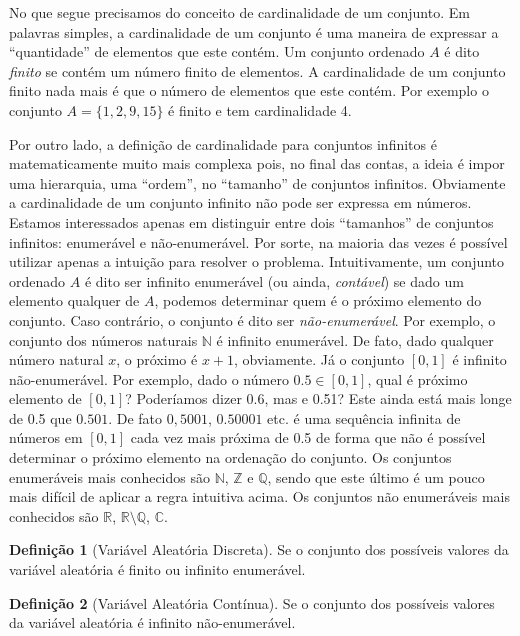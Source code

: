 \documentclass[
]{book}
\theoremstyle{definition}
\newtheorem{definition}{Definição}[chapter]
\theoremstyle{definition}
\theoremstyle{definition}
\theoremstyle{remark}
\begin{document}
No que segue precisamos do conceito de cardinalidade de um conjunto. Em palavras simples, a cardinalidade de um conjunto é uma maneira de expressar a ``quantidade'' de elementos que este contém. Um conjunto ordenado \(A\) é dito \emph{finito} se contém um número finito de elementos. A cardinalidade de um conjunto finito nada mais é que o número de elementos que este contém. Por exemplo o conjunto \(A=\{1,2,9,15\}\) é finito e tem cardinalidade 4.

Por outro lado, a definição de cardinalidade para conjuntos infinitos é matematicamente muito mais complexa pois, no final das contas, a ideia é impor uma hierarquia, uma ``ordem'', no ``tamanho'' de conjuntos infinitos. Obviamente a cardinalidade de um conjunto infinito não pode ser expressa em números. Estamos interessados apenas em distinguir entre dois ``tamanhos'' de conjuntos infinitos: enumerável e não-enumerável. Por sorte, na maioria das vezes é possível utilizar apenas a intuição para resolver o problema. Intuitivamente, um conjunto ordenado \(A\) é dito ser infinito
enumerável (ou ainda, \emph{contável}) se dado um elemento qualquer de \(A\), podemos determinar quem é o próximo elemento do conjunto. Caso contrário, o conjunto é dito ser \emph{não-enumerável}. Por exemplo, o conjunto dos números naturais \(\mathbb{N}\) é infinito enumerável. De fato, dado qualquer número natural \(x\), o próximo é \(x+1\), obviamente. Já o conjunto \([0,1]\) é infinito não-enumerável. Por exemplo, dado o número \(0.5\in[0,1]\), qual é próximo elemento de \([0,1]\)? Poderíamos dizer 0.6, mas e 0.51? Este ainda está mais longe de 0.5 que \(0.501\). De fato \(0,5001\), \(0.50001\) etc. é uma sequência infinita de números em \([0,1]\) cada vez mais próxima de 0.5 de forma que não é possível determinar o próximo elemento na ordenação do conjunto.
Os conjuntos enumeráveis mais conhecidos são \(\mathbb{N}\), \(\mathbb{Z}\) e \(\mathbb{Q}\), sendo que este último é um pouco mais difícil de aplicar a regra intuitiva acima. Os conjuntos não enumeráveis mais conhecidos são \(\mathbb{R}\), \(\mathbb{R}\setminus\mathbb{Q}\), \(\mathbb{C}\).

\begin{definition}[Variável Aleatória Discreta]
\protect\hypertarget{def:vad}{}{\label{def:vad} {} }Se o conjunto dos possíveis valores da variável aleatória é finito ou infinito enumerável.
\end{definition}

\begin{definition}[Variável Aleatória Contínua]
\protect\hypertarget{def:vac}{}{\label{def:vac} {} }Se o conjunto dos possíveis valores da variável aleatória é infinito não-enumerável.
\end{definition}
\end{document}
